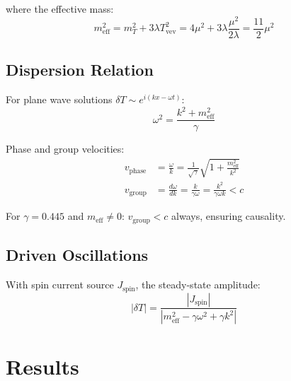 \documentclass[twocolumn,prd,superscriptaddress,nofootinbib]{revtex4-2}
\begin{document}
where the effective mass:
\begin{equation}
m_\text{eff}^2 = m_T^2 + 3\lambda T_\text{vev}^2 = 4\mu^2 + 3\lambda\frac{\mu^2}{2\lambda} = \frac{11}{2}\mu^2
\end{equation}

\subsection{Dispersion Relation}

For plane wave solutions $\delta T \sim e^{i(kx - \omega t)}$:
\begin{equation}
\boxed{\omega^2 = \frac{k^2 + m_\text{eff}^2}{\gamma}}
\label{eq:dispersion}
\end{equation}

Phase and group velocities:
\begin{align}
v_\text{phase} &= \frac{\omega}{k} = \frac{1}{\sqrt{\gamma}}\sqrt{1 + \frac{m_\text{eff}^2}{k^2}} \label{eq:vphase} \\
v_\text{group} &= \frac{d\omega}{dk} = \frac{k}{\gamma\omega} = \frac{k^2}{\gamma\omega k} < c \label{eq:vgroup}
\end{align}

For $\gamma = 0.445$ and $m_\text{eff} \neq 0$: $v_\text{group} < c$ always, ensuring causality.

\subsection{Driven Oscillations}

With spin current source $J_\text{spin}$, the steady-state amplitude:
\begin{equation}
|\delta T| = \frac{|J_\text{spin}|}{|m_\text{eff}^2 - \gamma\omega^2 + \gamma k^2|}
\end{equation}

\section{Results}
\end{document}

